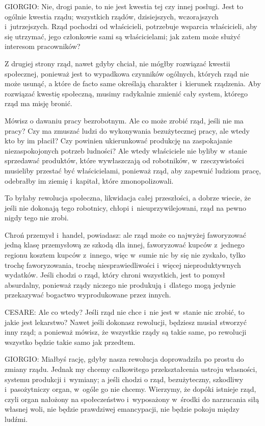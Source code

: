 \documentclass[oneside,polish,11pt,sfheadings]{mwbk}
\begin{document}
 
\noindent GIORGIO: Nie, drogi panie, to nie jest kwestia tej czy innej posługi. Jest to ogólnie kwestia rządu; wszystkich rządów,
dzisiejszych, wczorajszych i~jutrzejszych. Rząd pochodzi od właścicieli, potrzebuje wsparcia właścicieli, aby się
utrzymać, jego członkowie sami są właścicielami; jak zatem może służyć interesom pracowników? 

 
Z drugiej strony rząd, nawet gdyby chciał, nie mógłby rozwiązać kwestii społecznej, ponieważ jest to wypadkowa czynników
ogólnych, których rząd nie może usunąć, a które de facto same określają charakter i~kierunek rządzenia. Aby rozwiązać
kwestię społeczną, musimy radykalnie zmienić cały system, którego rząd ma misję bronić. 

 
Mówisz o dawaniu pracy bezrobotnym. Ale co może zrobić rząd, jeśli nie ma pracy? Czy ma zmuszać ludzi do wykonywania
bezużytecznej pracy, ale wtedy kto by im płacił? Czy powinien ukierunkować produkcję na zaspokajanie niezaspokojonych
potrzeb ludności? Ale wtedy właściciele nie byliby w~stanie sprzedawać produktów, które wywłaszczają od robotników, w~rzeczywistości musieliby przestać być właścicielami, ponieważ rząd, aby zapewnić ludziom pracę, odebrałby im ziemię i~kapitał, które zmonopolizowali. 

 
To byłaby rewolucja społeczna, likwidacja całej przeszłości, a dobrze wiecie, że jeśli nie dokonają tego robotnicy,
chłopi i~nieuprzywilejowani, rząd na pewno nigdy tego nie zrobi. 

 
Chroń przemysł i~handel, powiadasz: ale rząd może co najwyżej faworyzować jedną klasę przemysłową ze szkodą dla innej,
faworyzować kupców z~jednego regionu kosztem kupców z~innego, więc w~sumie nic by się nie zyskało, tylko trochę
faworyzowania, trochę niesprawiedliwości i~więcej nieproduktywnych wydatków. Jeśli chodzi o rząd, który chroni
wszystkich, jest to pomysł absurdalny, ponieważ rządy niczego nie produkują i~dlatego mogą jedynie przekazywać bogactwo
wyprodukowane przez innych. 




 
\noindent CESARE: Ale co wtedy? Jeśli rząd nie chce i~nie jest w~stanie nic zrobić, to jakie jest lekarstwo? Nawet jeśli dokonasz
rewolucji, będziesz musiał stworzyć inny rząd; a ponieważ mówisz, że wszystkie rządy są takie same, po rewolucji
wszystko będzie takie samo jak przedtem. 




 
\noindent GIORGIO: Miałbyś rację, gdyby nasza rewolucja doprowadziła po prostu do zmiany rządu. Jednak my chcemy całkowitego
przekształcenia ustroju własności, systemu produkcji i~wymiany; a jeśli chodzi o rząd, bezużyteczny, szkodliwy i~pasożytniczy organ, w~ogóle go nie chcemy. Wierzymy, że dopóki istnieje rząd, czyli organ nałożony na społeczeństwo i~wyposażony w~środki do narzucania siłą własnej woli, nie będzie prawdziwej emancypacji, nie będzie pokoju między
ludźmi. 
\end{document}

